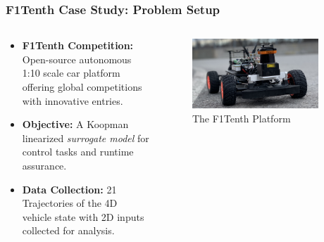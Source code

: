 \documentclass[shortpres,aspectratio=43]{beamer}
\begin{document}
\begin{frame}
\frametitle{F1Tenth Case Study: Problem Setup}
\begin{columns}
	\begin{column}{0.5\textwidth}
	\begin{itemize}
	    \item<1-> \textbf{F1Tenth Competition:} Open-source autonomous 1:10 scale car platform offering global competitions with innovative entries.
	    \item<3-> \textbf{Objective:} A Koopman linearized \textit{surrogate model} for control tasks and runtime assurance.
	    \item<4-> \textbf{Data Collection:} 21 Trajectories of the 4D vehicle state with 2D inputs collected for analysis.
	\end{itemize}
	\vspace{50pt}
	\end{column}
	\begin{column}{0.4\textwidth}
		\begin{figure}
		\centering
		  \includegraphics[width=0.9\textwidth]{./img/f1tenth.png}
		  \caption{The F1Tenth Platform}
		\end{figure}
	\end{column}
\end{columns}
\end{frame}
\end{document}
